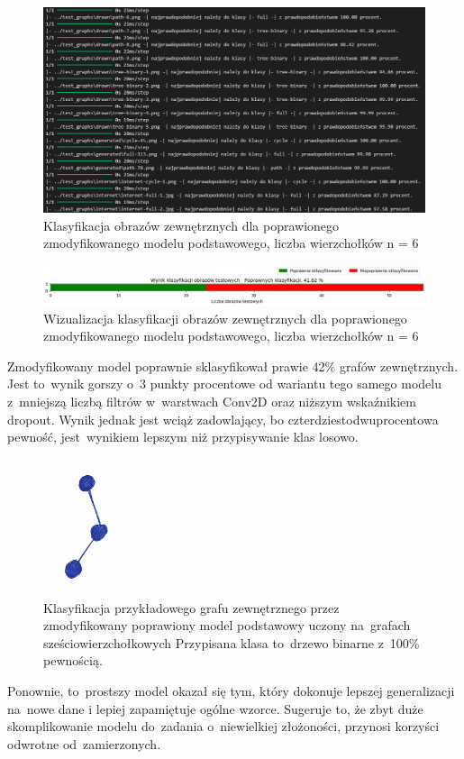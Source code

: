 \begin{figure}[ht]
	\centering
	\includegraphics[width=15.5cm]{resources/tests/images/v4/base6_1_1_txt.png}
	\caption{Klasyfikacja obrazów zewnętrznych dla poprawionego zmodyfikowanego modelu podstawowego, liczba wierzchołków n = 6}
	\label{Fig:tests-best-2b}
\end{figure}
\FloatBarrier

\begin{figure}[ht]
	\centering
	\includegraphics[width=15.5cm]{resources/tests/images/v4/base6_1_1_bar.png}
	\caption{Wizualizacja klasyfikacji obrazów zewnętrznych dla poprawionego zmodyfikowanego modelu podstawowego, liczba wierzchołków n = 6}
	\label{Fig:tests-best-1c}
\end{figure}
\FloatBarrier

Zmodyfikowany model poprawnie sklasyfikował prawie 42\% grafów zewnętrznych.
Jest to~wynik gorszy o~3 punkty procentowe od wariantu tego samego modelu
z~mniejszą liczbą filtrów w~warstwach Conv2D oraz niższym wskaźnikiem dropout.
Wynik jednak jest wciąż zadowlający, bo czterdziestodwuprocentowa pewność,
jest~wynikiem lepszym niż przypisywanie klas losowo.

\begin{figure}[ht]
	\centering
	\includegraphics[height=4cm]{../graph_classification/test_graphs/drawn/path-4.png}
	\caption{Klasyfikacja przykładowego grafu zewnętrznego przez zmodyfikowany poprawiony model podstawowy
		uczony na~grafach sześciowierzchołkowych
		Przypisana klasa to~drzewo binarne z~100\% pewnością.}
	\label{Fig:tests-best-1d}
\end{figure}
\FloatBarrier

Ponownie, to~prostszy model okazał się tym, który dokonuje lepszej generalizacji na~nowe dane
i lepiej zapamiętuje ogólne wzorce.
Sugeruje to, że zbyt duże skomplikowanie modelu do~zadania o~niewielkiej złożoności,
przynosi korzyści odwrotne od~zamierzonych.